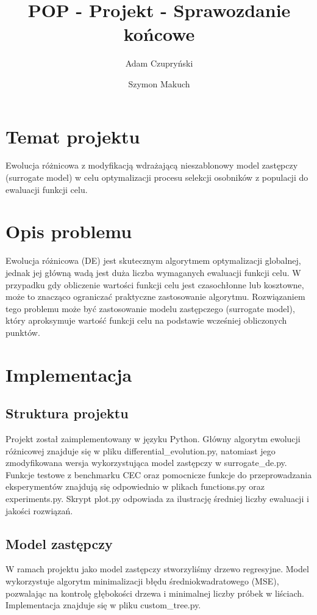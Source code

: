 \documentclass{article}
\title{POP - Projekt - Sprawozdanie końcowe}
\author{Adam Czupryński \and Szymon Makuch}
\begin{document}
\maketitle

\section{Temat projektu}
Ewolucja różnicowa z modyfikacją wdrażającą nieszablonowy model zastępczy (surrogate model) w celu optymalizacji procesu selekcji osobników z populacji do ewaluacji funkcji celu.

\section{Opis problemu}
Ewolucja różnicowa (DE) jest skutecznym algorytmem optymalizacji globalnej, jednak jej główną wadą jest duża liczba wymaganych ewaluacji funkcji celu. W przypadku gdy obliczenie wartości funkcji celu jest czasochłonne lub kosztowne, może to znacząco ograniczać praktyczne zastosowanie algorytmu. Rozwiązaniem tego problemu może być zastosowanie modelu zastępczego (surrogate model), który aproksymuje wartość funkcji celu na podstawie wcześniej obliczonych punktów.

\section{Implementacja}
\subsection{Struktura projektu}
Projekt został zaimplementowany w języku Python. Główny algorytm ewolucji różnicowej znajduje się w pliku differential\_evolution.py, natomiast jego zmodyfikowana wersja wykorzystująca model zastępczy w surrogate\_de.py. Funkcje testowe z benchmarku CEC oraz pomocnicze funkcje do przeprowadzania eksperymentów znajdują się odpowiednio w plikach functions.py oraz experiments.py. Skrypt plot.py odpowiada za ilustrację średniej liczby ewaluacji i jakości rozwiązań. 

\subsection{Model zastępczy}
W ramach projektu jako model zastępczy stworzyliśmy drzewo regresyjne. Model wykorzystuje algorytm minimalizacji błędu średniokwadratowego (MSE), pozwalając na kontrolę głębokości drzewa i minimalnej liczby próbek w liściach. Implementacja znajduje się w pliku custom\_tree.py.
\end{document}
